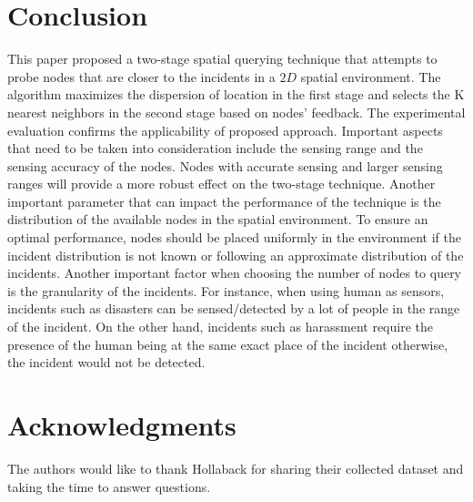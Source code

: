 \documentclass{acm_proc_article-sp}
\begin{document}
\section{Conclusion}
This paper proposed a two-stage spatial querying technique that attempts to probe nodes that are closer to the incidents in a $2D$ spatial environment. The algorithm maximizes the dispersion of location in the first stage and selects the K nearest neighbors in the second stage based on nodes' feedback. The experimental evaluation confirms the applicability of proposed approach.
Important aspects that need to be taken into consideration include the sensing range and the sensing accuracy of the nodes. Nodes with accurate sensing and larger sensing ranges will provide a more robust effect on the two-stage technique. Another important parameter that can impact the performance of the technique is the distribution of the available nodes in the spatial environment. To ensure an optimal performance, nodes should be placed uniformly in the environment if the incident distribution is not known or following an approximate distribution of the incidents. Another important factor when choosing the number of nodes to query is the granularity of the incidents. For instance, when using human as sensors, incidents such as disasters can be sensed/detected by a lot of people in the range of the incident. On the other hand, incidents such as harassment require the presence of the human being at the same exact place of the incident otherwise, the incident would not be detected.
\section{Acknowledgments}
The authors would like to thank Hollaback for sharing their collected dataset and taking the time to answer questions.

{\footnotesize
}  %
%
%
\end{document}
